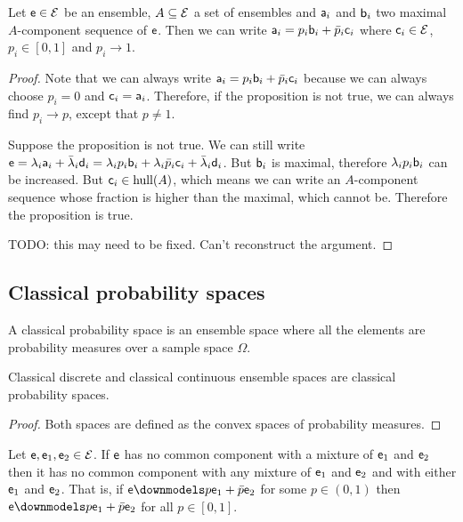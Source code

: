 \begin{prop}
	Let $\ens \in \Ens$ be an ensemble, $A \subseteq \Ens$ a set of ensembles and $\ens[a]_i$ and $\ens[b]_i$ two maximal $A$-component sequence of $\ens$. Then we can write $\ens[a]_i = p_i \ens[b]_i + \bar{p}_i \ens[c]_i$ where $\ens[c]_i \in \Ens$, $p_i \in [0,1]$ and $p_i \to 1$.
\end{prop}

\begin{proof}
	Note that we can always write $\ens[a]_i = p_i \ens[b]_i + \bar{p}_i \ens[c]_i$ because we can always choose $p_i = 0$ and $\ens[c]_i = \ens[a]_i$. Therefore, if the proposition is not true, we can always find $p_i \to p$, except that $p \neq 1$.
	
	Suppose the proposition is not true. We can still write $\ens = \lambda_i \ens[a]_i + \bar{\lambda}_i \ens[d]_i = \lambda_i p_i \ens[b]_i + \lambda_i \bar{p}_i \ens[c]_i + \bar{\lambda}_i \ens[d]_i$. But $\ens[b]_i$ is maximal, therefore $\lambda_i p_i \ens[b]_i$ can be increased. But $\ens[c]_i \in \hull(A)$, which means we can write an $A$-component sequence whose fraction is higher than the maximal, which cannot be. Therefore the proposition is true.
	
	TODO: this may need to be fixed. Can't reconstruct the argument.
\end{proof}

\subsection{Classical probability spaces}

\begin{defn}
	A classical probability space is an ensemble space where all the elements are probability measures over a sample space $\Omega$.
\end{defn}

\begin{coro}
	Classical discrete and classical continuous ensemble spaces are classical probability spaces.
\end{coro}

\begin{proof}
	Both spaces are defined as the convex spaces of probability measures.
\end{proof}

\begin{prop}\label{pm_es_separateExtendsMixtures}
	Let $\ens,\ens_1,\ens_2 \in \Ens$. If $\ens$ has no common component with a mixture of $\ens_1$ and $\ens_2$ then it has no common component with any mixture of $\ens_1$ and $\ens_2$ and with either $\ens_1$ and $\ens_2$. That is, if $\ens \separate p \ens_1 + \bar{p} \ens_2$ for some $p \in (0, 1)$ then $\ens \separate p \ens_1 + \bar{p} \ens_2$ for all $p \in [0, 1]$.
\end{prop}

